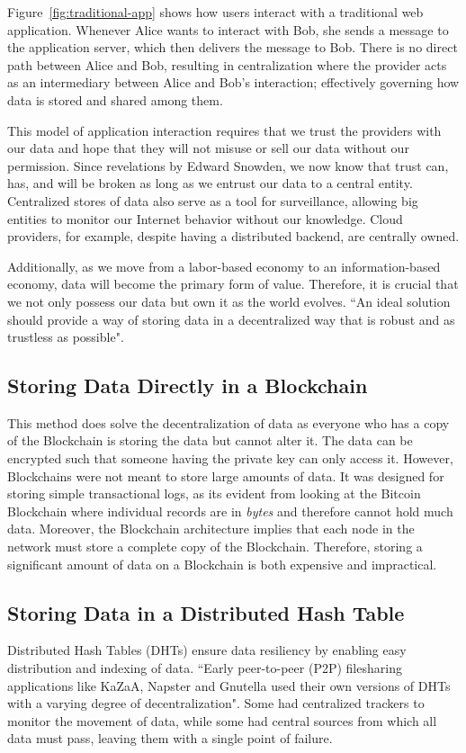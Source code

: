 	Figure~\ref{fig:traditional-app} shows how users interact with a traditional web application. Whenever Alice wants to interact with Bob, she sends a message to the application server, which then delivers the message to Bob. There is no direct path between Alice and Bob, resulting in centralization where the provider acts as an intermediary between Alice and Bob's interaction; effectively governing how data is stored and shared among them.
	
	This model of application interaction requires that we trust the providers with our data and hope that they will not misuse or sell our data without our permission. Since revelations by Edward Snowden\cite{greenwald2014no}, we now know that trust can, has, and will be broken as long as we entrust our data to a central entity\cite{raval2016decentralized}. Centralized stores of data also serve as a tool for surveillance, allowing big entities to monitor our Internet behavior without our knowledge. Cloud providers, for example,  despite having a distributed backend, are centrally owned.
	
	Additionally, as we move from a labor-based economy to an information-based economy, data will become the primary form of value. Therefore, it is crucial that we not only possess our data but own it as the world evolves. ``An ideal solution should provide a way of storing data in a decentralized way that is robust and as trustless as possible"\cite{raval2016decentralized}.
	
	\subsection{Storing Data Directly in a Blockchain}
		This method does solve the decentralization of data as everyone who has a copy of the Blockchain is storing the data but cannot alter it. The data can be encrypted such that someone having the private key can only access it. However, Blockchains were not meant to store large amounts of data. It was designed for storing simple transactional logs, as its evident from looking at the Bitcoin Blockchain where individual records are in \textit{bytes}\cite{wiki:transaction} and therefore cannot hold much data. Moreover, the Blockchain architecture implies that each node in the network must store a complete copy of the Blockchain. Therefore, storing a significant amount of data on a Blockchain is both expensive and impractical.
		
	\subsection{Storing Data in a Distributed Hash Table}
		Distributed Hash Tables (DHTs) ensure data resiliency by enabling easy distribution and indexing of data. ``Early peer-to-peer (P2P) filesharing applications like KaZaA\cite{good2003usability}, Napster\cite{ku2002creative} and Gnutella\cite{ripeanu2002mapping} used their own versions of DHTs with a varying degree of decentralization"\cite{raval2016decentralized}. Some had centralized trackers to monitor the movement of data, while some had central sources from which all data must pass, leaving them with a single point of failure\cite{raval2016decentralized}.
		
